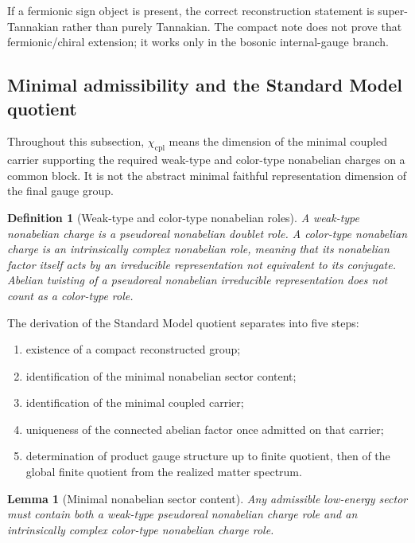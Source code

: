 \documentclass[11pt]{article}
\newtheorem{lemma}[theorem]{Lemma}
\newtheorem{definition}[theorem]{Definition}
\begin{document}
If a fermionic sign object is present, the correct reconstruction statement is super-Tannakian rather than purely Tannakian. The compact note does not prove that fermionic/chiral extension; it works only in the bosonic internal-gauge branch.

\subsection{Minimal admissibility and the Standard Model quotient}

Throughout this subsection, $\chi_{\mathrm{cpl}}$ means the dimension of the minimal coupled carrier supporting the required weak-type and color-type nonabelian charges on a common block. It is not the abstract minimal faithful representation dimension of the final gauge group.

\begin{definition}[Weak-type and color-type nonabelian roles]
A weak-type nonabelian charge is a pseudoreal nonabelian doublet role. A color-type nonabelian charge is an intrinsically complex nonabelian role, meaning that its nonabelian factor itself acts by an irreducible representation not equivalent to its conjugate. Abelian twisting of a pseudoreal nonabelian irreducible representation does not count as a color-type role.
\end{definition}

The derivation of the Standard Model quotient separates into five steps:
\begin{enumerate}[leftmargin=2em]
\item existence of a compact reconstructed group;
\item identification of the minimal nonabelian sector content;
\item identification of the minimal coupled carrier;
\item uniqueness of the connected abelian factor once admitted on that carrier;
\item determination of product gauge structure up to finite quotient, then of the global finite quotient from the realized matter spectrum.
\end{enumerate}

\begin{lemma}[Minimal nonabelian sector content]\label{lem:mincontent}
Any admissible low-energy sector must contain both a weak-type pseudoreal nonabelian charge role and an intrinsically complex color-type nonabelian charge role.
\end{lemma}
\end{document}
